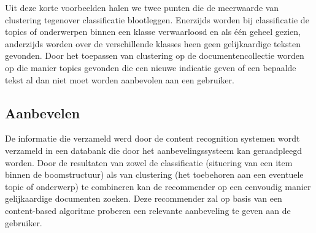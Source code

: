 Uit deze korte voorbeelden halen we twee punten die de meerwaarde van clustering tegenover classificatie blootleggen. Enerzijds worden bij classificatie de topics of onderwerpen binnen een klasse verwaarloosd en als \'e\'en geheel gezien, anderzijds worden over de verschillende klasses heen geen gelijkaardige teksten gevonden. Door het toepassen van clustering op de documentencollectie worden op die manier topics gevonden die een nieuwe indicatie geven of een bepaalde tekst al dan niet moet worden aanbevolen aan een gebruiker. 

\subsection{Aanbevelen}
De informatie die verzameld werd door de content recognition systemen wordt verzameld in een databank die door het aanbevelingssysteem kan geraadpleegd worden. Door de resultaten van zowel de classificatie (situering van een item binnen de boomstructuur) als van clustering (het toebehoren aan een eventuele topic of onderwerp) te combineren kan de recommender op een eenvoudig manier gelijkaardige documenten zoeken. Deze recommender zal op basis van een content-based algoritme proberen een relevante aanbeveling te geven aan de gebruiker. 